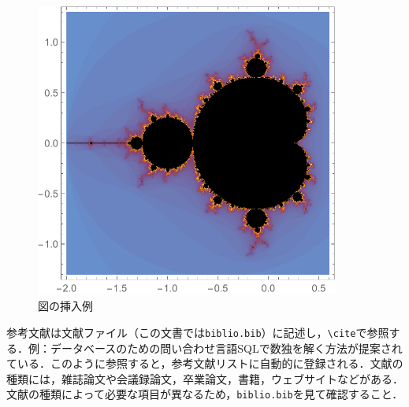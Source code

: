 \begin{figure}[htb]
\centering
\includegraphics[width=10cm]{figure.pdf}
\caption{図の挿入例}\label{サンプル図}
\end{figure}

参考文献は文献ファイル（この文書では\verb|biblio.bib|）に記述し，\verb|\cite|で参照する．例：データベースのための問い合わせ言語SQLで数独を解く方法が提案されている\cite{yabuki2011}．このように参照すると，参考文献リストに自動的に登録される．文献の種類には，雑誌論文\cite{yabuki2011}や会議録論文\cite{yabuki2013}，卒業論文\cite{kubo2014}，書籍\cite{okumura2013}，ウェブサイト\cite{self}などがある．文献の種類によって必要な項目が異なるため，\verb|biblio.bib|を見て確認すること．



